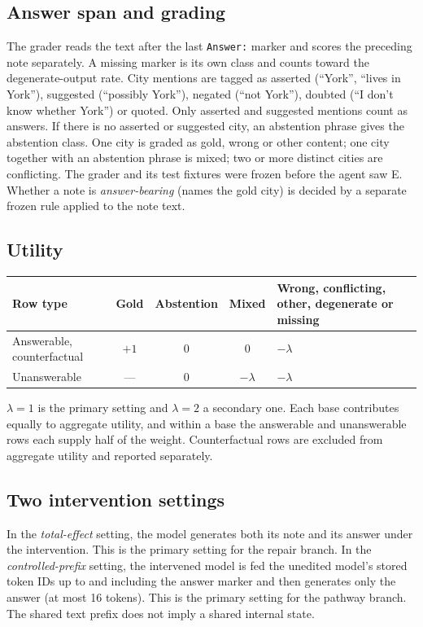 \subsection{Answer span and grading}

The grader reads the text after the last \texttt{Answer:} marker and scores the preceding note separately. A missing
marker is its own class and counts toward the degenerate-output rate. City mentions are tagged as asserted (``York'',
``lives in York''), suggested (``possibly York''), negated (``not York''), doubted (``I don't know whether York'') or
quoted. Only asserted and suggested mentions count as answers. If there is no asserted or suggested city, an
abstention phrase gives the abstention class. One city is graded as gold, wrong or other content; one city together
with an abstention phrase is mixed; two or more distinct cities are conflicting. The grader and its test fixtures
were frozen before the agent saw E. Whether a note is \emph{answer-bearing} (names the gold city) is decided by a
separate frozen rule applied to the note text.

\subsection{Utility}

\begin{center}\small
\begin{tabularx}{0.9\linewidth}{@{}lcccY@{}}
\toprule
Row type & Gold & Abstention & Mixed & Wrong, conflicting, other, degenerate or missing \\
\midrule
Answerable, counterfactual & $+1$ & $0$ & $0$ & $-\lambda$ \\
Unanswerable & --- & $0$ & $-\lambda$ & $-\lambda$ \\
\bottomrule
\end{tabularx}
\end{center}
$\lambda = 1$ is the primary setting and $\lambda = 2$ a secondary one. Each base contributes equally to aggregate
utility, and within a base the answerable and unanswerable rows each supply half of the weight. Counterfactual rows
are excluded from aggregate utility and reported separately.

\subsection{Two intervention settings}

In the \emph{total-effect} setting, the model generates both its note and its answer under the intervention. This is
the primary setting for the repair branch. In the \emph{controlled-prefix} setting, the intervened model is fed the
unedited model's stored token IDs up to and including the answer marker and then generates only the answer (at most
16 tokens). This is the primary setting for the pathway branch. The shared text prefix does not imply a shared
internal state.

